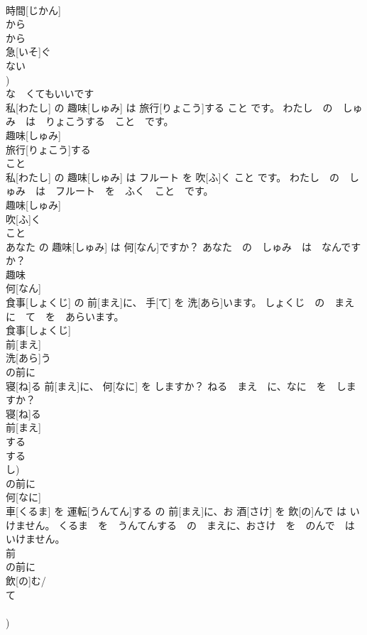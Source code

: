 \documentclass[8pt]{extreport}
\begin{document}
\begin{CJK}{UTF8}{min}
\\	時間[じかん] 
\\	から 
\\	から 
\\	急[いそ]ぐ 
\\	ない 
\\	[な])	
\\	な　くてもいいです 
\\	私[わたし] の 趣味[しゅみ] は 旅行[りょこう]する こと です。	わたし　の　しゅみ　は　りょこうする　こと　です。	
\\	趣味[しゅみ] 
\\	旅行[りょこう]する 
\\	こと 
\\	私[わたし] の 趣味[しゅみ] は フルート を 吹[ふ]く こと です。	わたし　の　しゅみ　は　フルート　を　ふく　こと　です。	
\\	趣味[しゅみ] 
\\	吹[ふ]く 
\\	こと 
\\	あなた の 趣味[しゅみ] は 何[なん]ですか？	あなた　の　しゅみ　は　なんですか？	
\\	趣味 
\\	何[なん] 
\\	食事[しょくじ] の 前[まえ]に、 手[て] を 洗[あら]います。	しょくじ　の　まえ　に　て　を　あらいます。	
\\	食事[しょくじ] 
\\	前[まえ] 
\\	洗[あら]う 
\\	の前に 
\\	寝[ね]る 前[まえ]に、 何[なに] を しますか？	ねる　まえ　に、なに　を　しますか？	
\\	寝[ね]る 
\\	前[まえ] 
\\	する 
\\	する 
\\	し)	
\\	の前に 
\\	何[なに] 
\\	車[くるま] を 運転[うんてん]する の 前[まえ]に、お 酒[さけ] を 飲[の]んで は いけません。	くるま　を　うんてんする　の　まえに、おさけ　を　のんで　は　いけません。	
\\	前 
\\	の前に 
\\	飲[の]む/ 
\\	て 
\\	[む/ぶ/ぬ] 
\\	[んで])	

\end{CJK}
\end{document}
